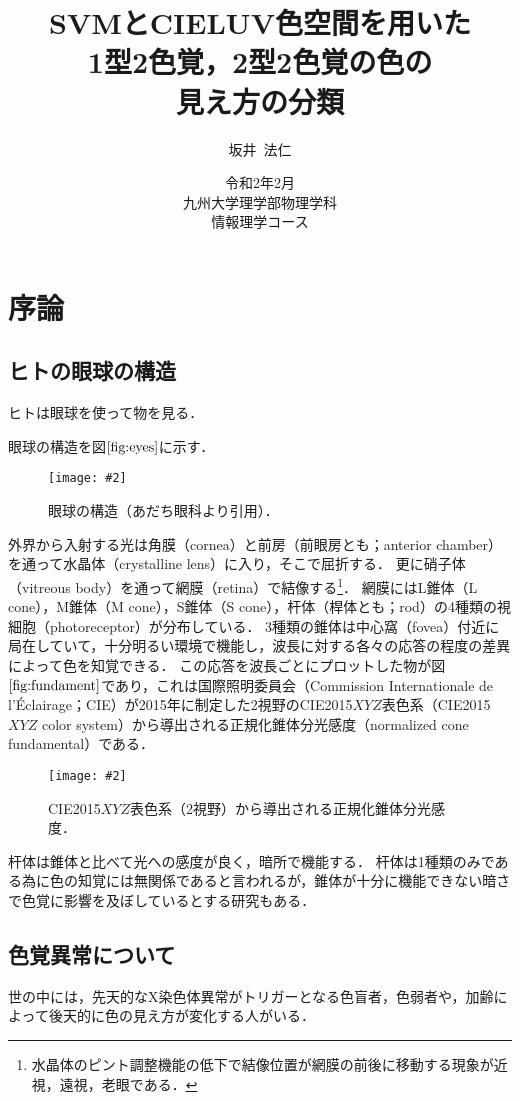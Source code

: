 \documentclass[uplatex,paper=a4,fontsize=4.0truemm,jafontsize=4.0truemm,head_space=30.0truemm,foot_space=30.0truemm,baselineskip=8.0truemm,line_length=40zw,gutter=25.0truemm,oneside,openany,fleqn,hanging_panctuation,open_bracket_pos=nibu_tentsuki,dvipdfmx,jis2004,book,titlepage]{jlreq}
\title{\vspace{-25truemm}\Huge{SVMとCIELUV色空間を用いた\\1型2色覚，2型2色覚の色の\\見え方の分類}\vspace{55truemm}}
\author{\huge{坂井~法仁}}
\date{\LARGE{令和2年2月}\\ \vspace{30truemm}\LARGE{九州大学理学部物理学科\\ 情報理学コース}}
\theoremstyle{mystyle}
\newcommand{\captiondot}[1]{\caption{#1．}}
\newcommand{\figureinput}[4]{\begin{figure}[tbp]\centering\texttt{[image: \#2]}\captiondot{#3}\label{fig:#4}\end{figure}}
\newcommand{\mathdisplaystyle}[1]{\(\displaystyle{#1}\)}
\newcommand{\Reference}[1]{\mathdisplaystyle{\ref{#1}}}
\begin{document}
	\maketitle
	\tableofcontents
	\clearpage
	\setcounter{page}{1}
	\chapter{序論}
		\section{ヒトの眼球の構造}
			ヒトは眼球を使って物を見る．

			眼球の構造を図\Reference{fig:eyes}に示す．
			\figureinput{width=9.5truecm}{D:/a/figs/eye.png}{眼球の構造（あだち眼科\cite{Adachi2006}より引用）}{eyes}
			外界から入射する光は角膜（cornea）と前房（前眼房とも；anterior chamber）を通って水晶体（crystalline lens）に入り，そこで屈折する．
			更に硝子体（vitreous body）を通って網膜（retina）で結像する\footnote{水晶体のピント調整機能の低下で結像位置が網膜の前後に移動する現象が近視，遠視，老眼である．}．
			網膜にはL錐体（L cone），M錐体（M cone），S錐体（S cone），杆体（桿体とも；rod）の4種類の視細胞（photoreceptor）が分布している．
			3種類の錐体は中心窩（fovea）付近に局在していて，十分明るい環境で機能し，波長に対する各々の応答の程度の差異によって色を知覚できる．
			この応答を波長ごとにプロットした物が図\Reference{fig:fundament}であり，これは国際照明委員会（Commission Internationale de l'Éclairage；CIE）が2015年に制定した2\textdegree 視野のCIE2015\mathdisplaystyle{XYZ}表色系（CIE2015\mathdisplaystyle{XYZ} color system）から導出される正規化錐体分光感度（normalized cone fundamental）である．
			\figureinput{width=\linewidth}{D:/a/figs/ConeFundamental.png}{CIE2015\mathdisplaystyle{XYZ}表色系（2\textdegree 視野）から導出される正規化錐体分光感度}{fundament}
			杆体は錐体と比べて光への感度が良く，暗所で機能する\cite{Hosoki2014}．
			杆体は1種類のみである為に色の知覚には無関係であると言われるが，錐体が十分に機能できない暗さで色覚に影響を及ぼしているとする研究もある\cite{Takeshita2014}．
		\section{色覚異常について}
			世の中には，先天的なX染色体異常がトリガーとなる色盲者\cite{Okabe2002a}，色弱者\cite{Sunaga2017}や，加齢によって後天的に色の見え方が変化する人\cite{Kuriki2000}がいる．
\end{document}
